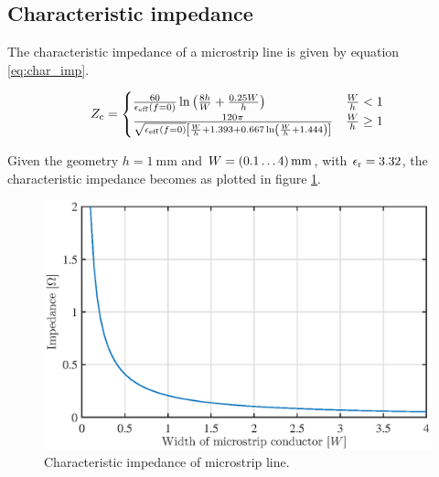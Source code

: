 \subsection{Characteristic impedance}
The characteristic impedance of a microstrip line is given by equation \ref{eq:char_imp}.

\begin{equation}
Z_{\rm c} =
\begin{cases}
\frac{60}{\epsilon_{\rm eff}(f=0)} \ln \left( \frac{8h}{W} + \frac{0.25W}{h} \right) & \frac{W}{h} < 1\\
\frac{120 \pi}{\sqrt{\epsilon_{\rm eff}(f=0)} \left[ \frac{W}{h} + 1.393 + 0.667 \ln \left( \frac{W}{h} + 1.444 \right) \right]} & \frac{W}{h} \geq 1
\end{cases}
\label{eq:char_imp}
\end{equation}

Given the geometry $h = \SI{1}{\milli\meter}$ and $W = \mSIrange{0.1}{4}{\milli\meter}$, with $\epsilon_{\rm r} = 3.32$, the characteristic impedance becomes as plotted in figure \ref{fig:char_imped}.

\begin{figure}[h t b p]
	\centering
	\includegraphics[width=\textwidth,keepaspectratio]{figures/char_imped_t8.eps}
	\caption{Characteristic impedance of microstrip line.}
	\label{fig:char_imped}
\end{figure}